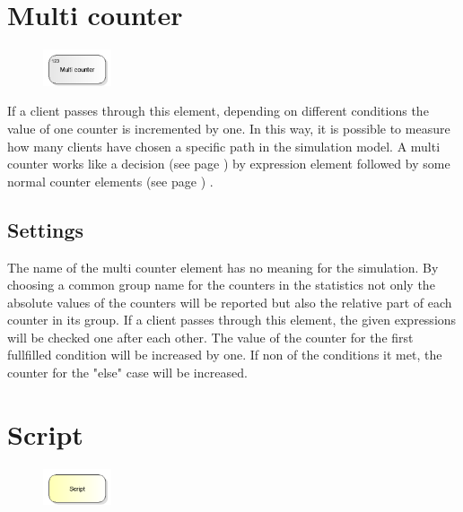 \section{Multi counter}
\label{ref:ModelElementCounterMulti}

\begin{figure}
\vspace{-22pt}
\includegraphics[width=2cm]{imageModelElementCounterMulti.png}
\vspace{-22pt}
\end{figure}

If a client passes through this element, depending on different conditions the value
of one counter is incremented by one. In this way, it is possible to measure how many
clients have chosen a specific path in the simulation model. A multi counter works
like a decision (see page \pageref{ref:ModelElementDecide}) by expression element followed
by some normal counter elements (see page \pageref{ref:ModelElementCounter}) .

\subsection*{Settings}

The name of the multi counter element has no meaning for the simulation. By choosing
a common group name for the counters in the statistics not only the absolute values
of the counters will be reported but also the relative part of each counter in its
group. If a client passes through this element, the given expressions will be checked
one after each other. The value of the counter for the first fullfilled condition will
be increased by one. If non of the conditions it met, the counter for the "else" case
will be increased.


\section{Script}
\label{ref:ModelElementSetJS}

\begin{figure}
\vspace{-22pt}
\includegraphics[width=2cm]{imageModelElementSetJS.png}
\vspace{-22pt}
\end{figure}

